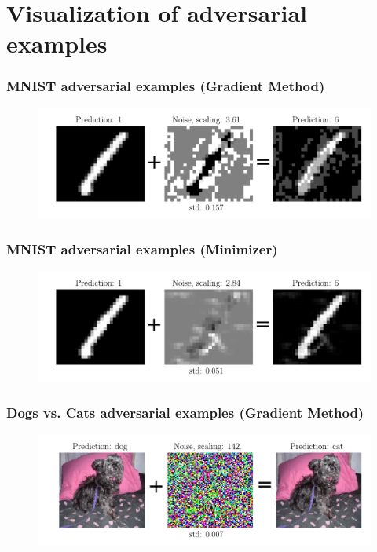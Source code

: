\documentclass[handout]{beamer}
\begin{document}
\section{Visualization of adversarial examples}

\begin{frame}
\frametitle{MNIST adversarial examples (Gradient Method)} 
\begin{figure}
\includegraphics[width=\linewidth]{../figures/mnist_model2_I0_f0276.pdf}
\end{figure}
\end{frame}

\begin{frame}
\frametitle{MNIST adversarial examples (Minimizer)} 
\begin{figure}
\includegraphics[width=\linewidth]{../figures/adv_example_minimizer_mnist.pdf}
\end{figure}
\end{frame}

\begin{frame}
\frametitle{Dogs vs. Cats adversarial examples (Gradient Method)} 
\begin{figure}
\includegraphics[width=\linewidth]{../figures/cvd_model9_I0_f0007.pdf}
\end{figure}
\end{frame}
\end{document}
